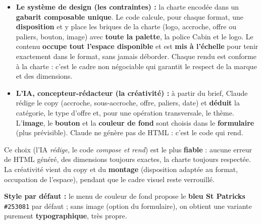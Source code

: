\documentclass[11pt,a4paper]{article}
\begin{document}
\begin{itemize}[leftmargin=1.4em]
  \item \textbf{Le système de design (les contraintes) :} la charte encodée dans un
        \textbf{gabarit composable unique}. Le code calcule, pour chaque format, une
        \textbf{disposition} et y place les briques de la charte (logo, accroche,
        offre ou paliers, bouton, image) avec \textbf{toute la palette}, la police
        Cabin et le logo. Le contenu \textbf{occupe tout l'espace disponible} et est
        \textbf{mis à l'échelle} pour tenir exactement dans le format, sans jamais
        déborder. Chaque rendu est conforme à la charte : c'est le cadre non
        négociable qui garantit le respect de la marque et des dimensions.
  \item \textbf{L'IA, concepteur-rédacteur (la créativité) :} à partir du brief,
        Claude rédige le copy (accroche, sous-accroche, offre, paliers, date) et \textbf{déduit} la
        catégorie, le type d'offre et, pour une opération transversale, le thème.
        L'\textbf{image}, le \textbf{bouton} et la \textbf{couleur de fond} sont
        choisis dans le \textbf{formulaire} (plus prévisible). Claude ne génère pas de
        HTML : c'est le code qui rend.
\end{itemize}

Ce choix (l'IA \emph{rédige}, le code \emph{compose et rend}) est le plus
\textbf{fiable} : aucune erreur de HTML généré, des dimensions toujours exactes, la
charte toujours respectée. La créativité vient du copy et du \textbf{montage}
(disposition adaptée au format, occupation de l'espace), pendant que le cadre visuel
reste verrouillé.

\textbf{Style par défaut :} le menu de couleur de fond propose le \textbf{bleu St
Patricks} \texttt{\#253081} par défaut ; sans image (option du formulaire), on obtient
une variante purement \textbf{typographique}, très propre.
\end{document}

